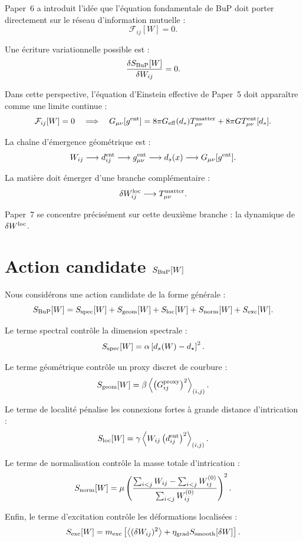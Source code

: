\documentclass[11pt,a4paper]{article}
\begin{document}
Paper~6 a introduit l'idée que l'équation fondamentale de BuP doit porter
directement sur le réseau d'information mutuelle :
\[
\mathcal{F}_{ij}[W]=0.
\]

Une écriture variationnelle possible est :
\[
\frac{\delta S_{\rm BuP}[W]}{\delta W_{ij}}=0.
\]

Dans cette perspective, l'équation d'Einstein effective de Paper~5 doit apparaître
comme une limite continue :
\[
\mathcal{F}_{ij}[W]=0
\quad
\Longrightarrow
\quad
G_{\mu\nu}[g^{\rm ent}]
=
8\pi G_{\rm eff}(d_s)T_{\mu\nu}^{\rm matter}
+
8\pi G T_{\mu\nu}^{\rm ent}[d_s].
\]

La chaîne d'émergence géométrique est :
\[
W_{ij}
\longrightarrow
d_{ij}^{\rm ent}
\longrightarrow
g_{\mu\nu}^{\rm ent}
\longrightarrow
d_s(x)
\longrightarrow
G_{\mu\nu}[g^{\rm ent}].
\]

La matière doit émerger d'une branche complémentaire :
\[
\delta W_{ij}^{\rm loc}
\longrightarrow
T_{\mu\nu}^{\rm matter}.
\]

Paper~7 se concentre précisément sur cette deuxième branche : la dynamique de
\(\delta W^{\rm loc}\).

\section{Action candidate \(S_{\rm BuP}[W]\)}

Nous considérons une action candidate de la forme générale :
\[
S_{\rm BuP}[W]
=
S_{\rm spec}[W]
+
S_{\rm geom}[W]
+
S_{\rm loc}[W]
+
S_{\rm norm}[W]
+
S_{\rm exc}[W].
\]

Le terme spectral contrôle la dimension spectrale :
\[
S_{\rm spec}[W]
=
\alpha
\left[
d_s(W)-d_\star
\right]^2.
\]

Le terme géométrique contrôle un proxy discret de courbure :
\[
S_{\rm geom}[W]
=
\beta
\left\langle
\left(G_{ij}^{\rm proxy}\right)^2
\right\rangle_{(i,j)}.
\]

Le terme de localité pénalise les connexions fortes à grande distance
d'intrication :
\[
S_{\rm loc}[W]
=
\gamma
\left\langle
W_{ij}\left(d_{ij}^{\rm ent}\right)^2
\right\rangle_{(i,j)}.
\]

Le terme de normalisation contrôle la masse totale d'intrication :
\[
S_{\rm norm}[W]
=
\mu
\left(
\frac{\sum_{i<j}W_{ij}-\sum_{i<j}W^{(0)}_{ij}}
{\sum_{i<j}W^{(0)}_{ij}}
\right)^2.
\]

Enfin, le terme d'excitation contrôle les déformations localisées :
\[
S_{\rm exc}[W]
=
m_{\rm exc}
\left[
\left\langle
(\delta W_{ij})^2
\right\rangle
+
\eta_{\rm grad}
S_{\rm smooth}[\delta W]
\right].
\]
\end{document}
